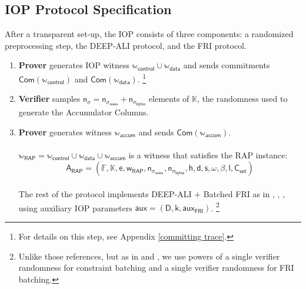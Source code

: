 \documentclass[10pt,letterpaper,titlepage]{article}
\theoremstyle{definition}
\begin{document}
\subsection{IOP Protocol Specification}
\label{IOP spec}
After a transparent set-up, the IOP consists of three components: a randomized preprocessing step, the DEEP-ALI protocol, and the FRI protocol.
\begin{enumerate}\addtocounter{enumi}{0}
\subsubsection{Randomized Preprocessing}
  \item \textbf{Prover} generates IOP witness $\mathbb{w}_\mathsf{control}\cup\mathbb{w}_\mathsf{data}$ and sends commitments $\mathsf{Com}(\mathbb{w}_\mathsf{control})$ and $\mathsf{Com}(\mathbb{w}_\mathsf{data})$.%
  \footnote{For details on this step, see Appendix \ref{committing trace}.} 
  \item \textbf{Verifier} samples $\mathsf{n}_\sigma=\mathsf{n}_{\sigma_\mathsf{mem}}+\mathsf{n}_{\sigma_\mathsf{bytes}}$ elements of $\mathbb{K}$, the randomness used to generate the Accumulator Columns. 
  \item \textbf{Prover} generates witness $\mathbb{w}_\mathsf{accum}$ and sends $\mathsf{Com}(\mathbb{w}_\mathsf{accum})$.\\
  \\
  $\mathbb{w}_\mathsf{RAP}=\mathbb{w}_\mathsf{control}\cup\mathbb{w}_\mathsf{data}\cup\mathbb{w}_\mathsf{accum}$ is a witness that satisfies the RAP instance:
  \[\mathsf{A}_\mathsf{RAP} = 
  (\mathbb{F}, 
  \mathbb{K}, 
  \mathsf{e},
  \mathsf{w}_\mathsf{RAP}, 
  \mathsf{n}_{\sigma_\mathsf{mem}}, 
  \mathsf{n}_{\sigma_\mathsf{bytes}}, 
  \mathsf{h}, 
  \mathsf{d}, 
  \mathsf{s}, 
  \omega, 
  \beta,
  \mathsf{l}, 
  \mathsf{C}_\mathsf{set})\]
  \\
  The rest of the protocol implements DEEP-ALI + Batched FRI as in \cite{ethSTARK}, \cite{deepFRI}, \cite{proxGaps}, 
  using auxiliary IOP parameters $\mathsf{aux} = (\mathsf{D},\mathsf{k},\mathsf{aux}_\mathsf{FRI})$.%
  \footnote{Unlike those references, but as in \cite{FRIsummary} and \cite{plonky2}, we use powers of a single verifier randomness for constraint batching and a single verifier randomness for FRI batching.} 

\end{enumerate}
\end{document}
